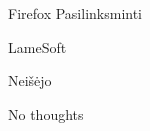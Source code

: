 \begin{xcase}{Firefox}
  \xcgoal
  {
    Pasilinksminti
  }
  
  \xctools
  {
    LameSoft
  }
  
  \xcresult
  {
    Neišėjo
  }
  
  \xcprinciples
  {
  }
  
  \xcthoughts
  {
    No thoughts
  }
\end{xcase}
